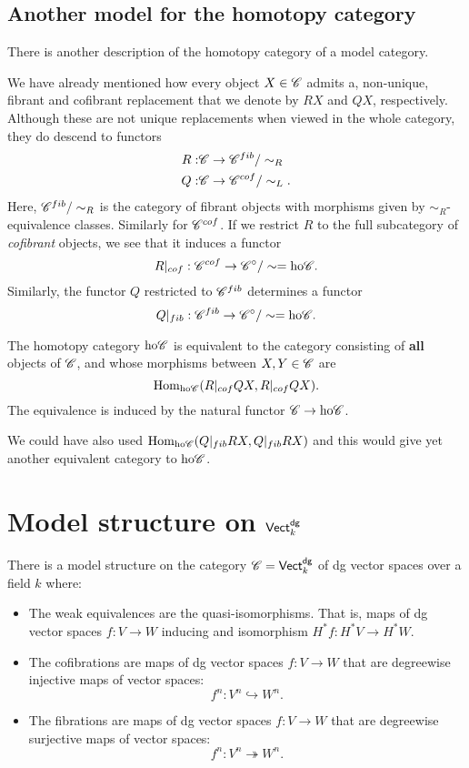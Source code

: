 \documentclass[11pt]{amsart}
\def\ho{{\rm ho}}
\begin{document}
\subsection{Another model for the homotopy category}

There is another description of the homotopy category of a model category. 

We have already mentioned how every object $X \in \mathscr C$ admits a, non-unique, fibrant and cofibrant replacement that we denote by $RX$ and $QX$, respectively. 
Although these are not unique replacements when viewed in the whole category, they do descend to functors
\begin{align*}
R : & \mathscr C \to \mathscr C^{fib} / \sim_R \\
Q : & \mathscr C \to \mathscr C^{cof} / \sim_L .
\end{align*}
Here, $\mathscr C^{fib} / \sim_R$ is the category of fibrant objects with morphisms given by $\sim_R$-equivalence classes.
Similarly for $\mathscr C^{cof}$. 
If we restrict $R$ to the full subcategory of {\em cofibrant} objects, we see that it induces a functor
\[
R |_{cof} : \sC^{cof} \to \sC^{\circ}/\sim = \ho \sC .
\]
Similarly, the functor $Q$ restricted to $\mathscr C^{fib}$ determines a functor
\[
Q |_{fib} : \sC^{fib} \to \sC^{\circ}/\sim = \ho \sC .
\]

\begin{prop}
The homotopy category $\ho \sC$ is equivalent to the category consisting of {\bf all} objects of $\mathscr C$, and whose morphisms between $X, Y \in \mathscr C$ are
\[
\Hom_{\ho \sC}(R|_{cof} Q X, R|_{cof} Q X) .
\]
The equivalence is induced by the natural functor $\sC \to \ho \sC$. 
\end{prop}

\begin{rmk}
We could have also used $\Hom_{\ho \sC}(Q|_{fib} R X, Q|_{fib} R X)$ and this would give yet another equivalent category to $\ho \sC$. 
\end{rmk}

\section{Model structure on ${\sf Vect}^{\sf dg}_k$}

There is a model structure on the category $\mathscr C = {\sf Vect}^{\sf dg}_k$ of dg vector spaces over a field $k$ where:
\begin{itemize}
\item The weak equivalences are the quasi-isomorphisms.
That is, maps of dg vector spaces $f : V \to W$ inducing and isomorphism $H^*f : H^*V \to H^*W$. 
\item The cofibrations are maps of dg vector spaces $f : V \to W$ that are degreewise injective maps of vector spaces:
\[
f^n : V^n \hookrightarrow W^n .
\]
\item The fibrations are maps of dg vector spaces $f : V \to W$ that are degreewise surjective maps of vector spaces:
\[
f^n : V^n \twoheadrightarrow W^n .
\] 
\end{itemize}
\end{document}
